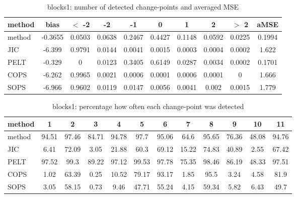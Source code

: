 \begin{table}[ht]
\centering
\begin{tabular}{l|c|ccccccc|c}
  \hline
method & bias & $<$ -2 & -2 & -1 & 0 & 1 & 2 & $>$ 2 & aMSE \\ 
  \hline
method & -0.3655 & 0.0503 & 0.0638 & 0.2467 & 0.4427 & 0.1148 & 0.0592 & 0.0225 & 0.1994 \\ 
  JIC & -6.399 & 0.9791 & 0.0144 & 0.0041 & 0.0015 & 0.0003 & 0.0004 & 0.0002 & 1.622 \\ 
  PELT & -0.329 &     0 & 0.0123 & 0.3405 & 0.6149 & 0.0287 & 0.0034 & 0.0002 & 0.1701 \\ 
  COPS & -6.262 & 0.9965 & 0.0021 & 0.0006 & 0.0001 & 0.0006 & 0.0001 &     0 & 1.666 \\ 
  SOPS & -6.966 & 0.9602 & 0.0119 & 0.0147 & 0.0056 & 0.0041 & 0.002 & 0.0015 & 1.779 \\ 
   \hline
\end{tabular}
\caption{blocks1: number of detected change-points and averaged MSE} 
\label{tab:blocks1Njumps}
\end{table}
\begin{table}[ht]
\centering
\begin{tabular}{l|ccccccccccc}
  \hline
method & 1 & 2 & 3 & 4 & 5 & 6 & 7 & 8 & 9 & 10 & 11 \\ 
  \hline
method &  94.51 &  97.46 &  84.71 &  94.78 &   97.7 &  95.06 &   64.6 &  95.65 &  76.36 &  48.08 &  94.76 \\ 
  JIC &   6.41 &  72.09 &   3.05 &  21.88 &   60.3 &  69.12 &  15.22 &  74.83 &  40.89 &   2.55 &  67.42 \\ 
  PELT &  97.52 &   99.3 &  89.22 &  97.12 &  99.53 &  97.78 &  75.35 &  98.46 &  86.19 &  48.33 &  97.51 \\ 
  COPS &   1.02 &  63.39 &   0.25 &  10.52 &  79.17 &  93.17 &   1.85 &   95.5 &   3.24 &   4.58 &   81.9 \\ 
  SOPS &   3.05 &  58.15 &   0.73 &   9.46 &  47.71 &  55.24 &   4.15 &  59.34 &   5.82 &   6.43 &   49.7 \\ 
   \hline
\end{tabular}
\caption{blocks1: percentage how often each change-point was detected} 
\label{tab:blocks1Detections}
\end{table}
